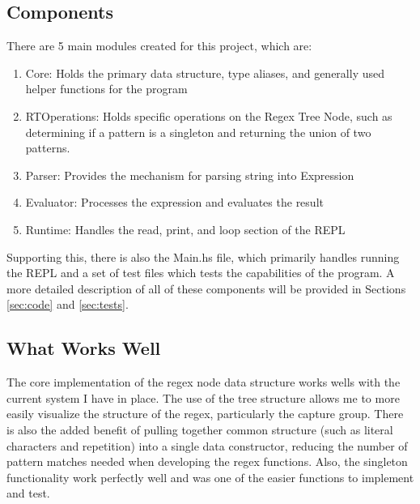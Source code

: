 \documentclass[letterpaper, 11pt]{article}
\begin{document}
\subsection{Components}\label{sec:components}
There are 5 main modules created for this project, which are:
\begin{enumerate}[itemsep=-0.2em]
    \item Core: Holds the primary data structure, type aliases, and generally used helper functions for the program
    \item RTOperations: Holds specific operations on the Regex Tree Node, such as determining if a pattern is a singleton and returning the union of two patterns.
    \item Parser: Provides the mechanism for parsing string into Expression
    \item Evaluator: Processes the expression and evaluates the result
    \item Runtime: Handles the read, print, and loop section of the REPL
\end{enumerate}
Supporting this, there is also the Main.hs file, which primarily handles running the REPL and a set of test files which tests the capabilities of the program.
A more detailed description of all of these components will be provided in Sections \ref*{sec:code} and \ref*{sec:tests}.

\subsection{What Works Well}\label{sec:working}
The core implementation of the regex node data structure works wells with the current system I have in place.
The use of the tree structure allows me to more easily visualize the structure of the regex, particularly the capture group.
There is also the added benefit of pulling together common structure (such as literal characters and repetition) into a single data constructor, reducing the number of pattern matches needed when developing the regex functions. 
Also, the singleton functionality work perfectly well and was one of the easier functions to implement and test.
\end{document}
